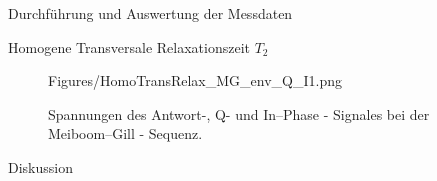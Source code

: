 \documentclass[pdftex, a4paper,11pt, twoside, ngerman]{report}
\begin{document}
\begin{chapter}{Durchführung und Auswertung der Messdaten}
\begin{section}{
        Homogene Transversale Relaxationszeit $T_{2}$}
\begin{subsection}
\begin{figure}[htb]
\begin{minipage}{.48\textwidth}
            {Figures/HomoTransRelax_MG_env_Q_I1.png}
            \caption{Spannungen des Antwort-, Q- und
              In--Phase - Signales bei der Meiboom--Gill - Sequenz.}
            \label{figMG_envQI1}
          \end{minipage}
        \end{figure}
        
      \end{subsection}
      
    \end{section}
    
    
    
    \newpage
    \begin{section}{Diskussion}
      \label{chpAuswertungDiskussion}
      
      
      
    \end{section}
   
  \end{chapter}
  
  
  
  
  
  
  
  \begin{thebibliography}{99}
    \scriptsize
    
  \end{thebibliography}
 
\end{document}
